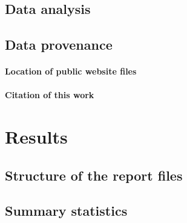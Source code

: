 \documentclass[fleqn,10pt]{SelfArx}\usepackage[]{graphicx}\usepackage[]{color}
\begin{document}
\subsection{Data analysis}
\lipsum[1]
\subsection{Data provenance}
\paragraph{Location of public website files} \lipsum[1] %
\paragraph{Citation of this work} \lipsum[1] %

\section{Results}
\lipsum[1]

\subsection{Structure of the report files}
\lipsum[1]

\subsection{Summary statistics}
\end{document}
